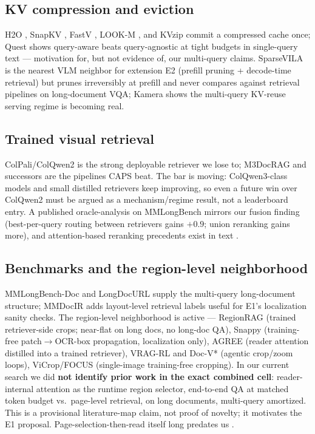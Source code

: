 \documentclass[11pt,letterpaper]{article}
\begin{document}
\subsection{KV compression and eviction}
H2O \citep{zhang2023h2o}, SnapKV \citep{li2024snapkv}, FastV \citep{chen2024fastv}, LOOK-M
\citep{wan2024lookm}, and KVzip \citep{kim2025kvzip} commit a compressed cache once; Quest
\citep{tang2024quest} shows query-aware beats query-agnostic at tight budgets in single-query
text --- motivation for, but not evidence of, our multi-query claims. SparseVILA
\citep{sparsevila2025} is the nearest VLM neighbor for extension E2 (prefill pruning + decode-time
retrieval) but prunes irreversibly at prefill and never compares against retrieval pipelines on
long-document VQA; Kamera \citep{kamera2026} shows the multi-query KV-reuse serving regime is
becoming real.

\subsection{Trained visual retrieval}
ColPali/ColQwen2 \citep{faysse2025colpali} is the strong deployable retriever we lose to; M3DocRAG
\citep{cho2024m3docrag} and successors are the pipelines CAPS beat. The bar is moving:
ColQwen3-class models and small distilled retrievers keep improving, so even a future win over
ColQwen2 must be argued as a mechanism/regime result, not a leaderboard entry. A published
oracle-analysis on MMLongBench \citep{hybridretriever2026} mirrors our fusion finding
(best-per-query routing between retrievers gains $+0.9$; union reranking gains more), and
attention-based reranking precedents exist in text \citep{chen2025icr,wu2025qrhead}.

\subsection{Benchmarks and the region-level neighborhood}
MMLongBench-Doc \citep{ma2024mmlongbench} and LongDocURL \citep{deng2025longdocurl} supply the
multi-query long-document structure; MMDocIR \citep{mmdocir2025} adds layout-level retrieval
labels useful for E1's localization sanity checks. The region-level neighborhood is active ---
RegionRAG \citep{regionrag2025} (trained retriever-side crops; near-flat on long docs, no long-doc
QA), Snappy \citep{snappy2025} (training-free patch$\to$OCR-box propagation, localization only),
AGREE \citep{agree2025} (reader attention distilled into a trained retriever), VRAG-RL
\citep{vragrl2025} and Doc-V* \citep{docvstar2026} (agentic crop/zoom loops), ViCrop/FOCUS
\citep{vicrop2025,focus2025} (single-image training-free cropping). In our current search we did
\textbf{not identify prior work in the exact combined cell}: reader-internal attention as the
runtime region selector, end-to-end QA at matched token budget vs.\ page-level retrieval, on long
documents, multi-query amortized. This is a provisional literature-map claim, not proof of
novelty; it motivates the E1 proposal. Page-selection-then-read itself long predates us
\citep{mpdocvqa2024}.
\end{document}
